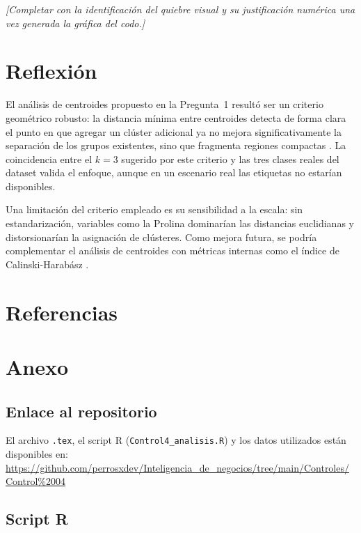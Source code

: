 \documentclass[10pt]{article}
\begin{document}
\textit{[Completar con la identificaci\'on del quiebre visual y su justificaci\'on
num\'erica una vez generada la gr\'afica del codo.]}

\section{Reflexi\'on}

El an\'alisis de centroides propuesto en la Pregunta~1 result\'o ser un criterio
geom\'etrico robusto: la distancia m\'inima entre centroides detecta de forma clara
el punto en que agregar un cl\'uster adicional ya no mejora significativamente la
separaci\'on de los grupos existentes, sino que fragmenta regiones compactas
\citep{james2021introduction}.
La coincidencia entre el $k=3$ sugerido por este criterio y las tres clases reales
del dataset \citep{forina1991wine} valida el enfoque, aunque en un escenario real
las etiquetas no estar\'ian disponibles.

Una limitaci\'on del criterio empleado es su sensibilidad a la escala: sin
estandarizaci\'on, variables como la Prolina dominar\'ian las distancias euclidianas
y distorsionar\'ian la asignaci\'on de cl\'usteres.
Como mejora futura, se podr\'ia complementar el an\'alisis de centroides con
m\'etricas internas como el \'indice de Calinski-Harab\'asz
\citep{james2021introduction}.

\section{Referencias}



\appendix
\section{Anexo}

\subsection{Enlace al repositorio}

El archivo \texttt{.tex}, el script R (\texttt{Control4\_analisis.R}) y los datos
utilizados est\'an disponibles en:\\
\url{https://github.com/perrosxdev/Inteligencia_de_negocios/tree/main/Controles/Control%2004}

\subsection{Script R}


\end{document}
